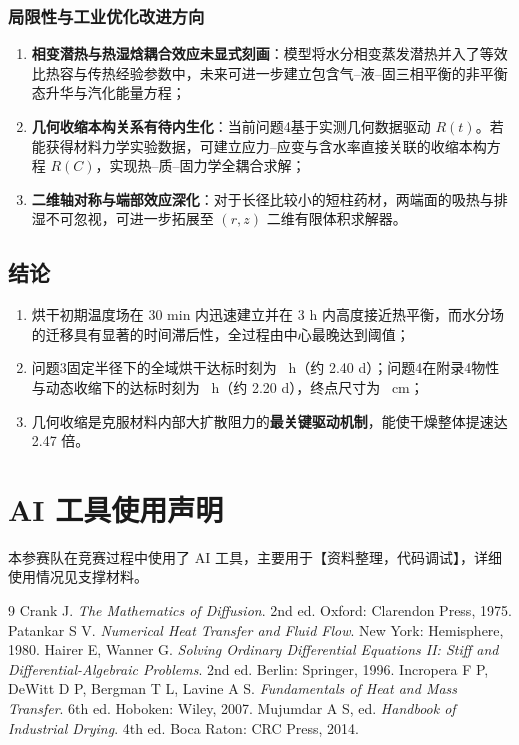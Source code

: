 \documentclass[12pt,a4paper,fontset=none]{ctexart}
\begin{document}
\subsubsection{局限性与工业优化改进方向}
\begin{enumerate}[label=(\arabic*)]
  \item \textbf{相变潜热与热湿焓耦合效应未显式刻画}：模型将水分相变蒸发潜热并入了等效比热容与传热经验参数中，未来可进一步建立包含气--液--固三相平衡的非平衡态升华与汽化能量方程；
  \item \textbf{几何收缩本构关系有待内生化}：当前问题4基于实测几何数据驱动 $R(t)$。若能获得材料力学实验数据，可建立应力--应变与含水率直接关联的收缩本构方程 $R(C)$，实现热--质--固力学全耦合求解；
  \item \textbf{二维轴对称与端部效应深化}：对于长径比较小的短柱药材，两端面的吸热与排湿不可忽视，可进一步拓展至 $(r,z)$ 二维有限体积求解器。
\end{enumerate}

\subsection{结论}
\begin{enumerate}[label=(\arabic*)]
  \item 烘干初期温度场在 30 min 内迅速建立并在 3 h 内高度接近热平衡，而水分场的迁移具有显著的时间滞后性，全过程由中心最晚达到阈值；
  \item 问题3固定半径下的全域烘干达标时刻为 \QThreeDryHours\ h（约 2.40 d）；问题4在附录4物性与动态收缩下的达标时刻为 \QFourDryHours\ h（约 2.20 d），终点尺寸为 \QFourDryRadius\ cm；
  \item 几何收缩是克服材料内部大扩散阻力的\textbf{最关键驱动机制}，能使干燥整体提速达 2.47 倍。
\end{enumerate}

\clearpage
\section*{AI 工具使用声明}
本参赛队在竞赛过程中使用了 AI 工具，主要用于【资料整理，代码调试】，详细使用情况见支撑材料。

\begin{thebibliography}{9}
 Crank J. \textit{The Mathematics of Diffusion}. 2nd ed. Oxford: Clarendon Press, 1975.
 Patankar S V. \textit{Numerical Heat Transfer and Fluid Flow}. New York: Hemisphere, 1980.
 Hairer E, Wanner G. \textit{Solving Ordinary Differential Equations II: Stiff and Differential-Algebraic Problems}. 2nd ed. Berlin: Springer, 1996.
 Incropera F P, DeWitt D P, Bergman T L, Lavine A S. \textit{Fundamentals of Heat and Mass Transfer}. 6th ed. Hoboken: Wiley, 2007.
 Mujumdar A S, ed. \textit{Handbook of Industrial Drying}. 4th ed. Boca Raton: CRC Press, 2014.
\end{thebibliography}
\end{document}
